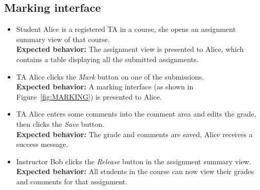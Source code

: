 \subsection{Marking interface}
\begin{itemize}
    \item Student Alice is a registered TA in a course, she opens an assignment
        summary view of that course. \\
    {\bf Expected behavior:} The assignment view is presented to Alice, which
        contains a table displaying all the submitted assignments.

    \item TA Alice clicks the \emph{Mark} button on one of the submissions.\\
    {\bf Expected behavior:} A marking interface (as shown in
    Figure~\ref{fig:MARKING}) is presented to Alice.

    \item TA Alice enters some comments into the comment area and edits the
        grade, then clicks the \emph{Save} button. \\
    {\bf Expected behavior:} The grade and comments are saved, Alice receives
        a success message.

    \item Instructor Bob clicks the \emph{Release} button in the assignment
        summary view. \\
    {\bf Expected behavior:} All students in the course can now view their
        grades and comments for that assignment.
\end{itemize}
